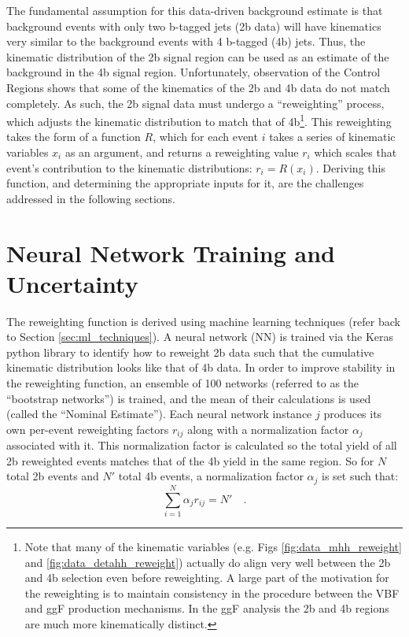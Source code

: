     The fundamental assumption for this data-driven background estimate
        is that background events with only two b-tagged jets (2b data)
        will have kinematics very similar to the background events with 4 b-tagged (4b) jets.
    Thus, the kinematic distribution of the 2b signal region can be used as an estimate of the background in the 4b signal region.
    Unfortunately, observation of the Control Regions shows that some of the kinematics of the 2b and 4b data do not match completely.
    As such, the 2b signal data must undergo a ``reweighting'' process,
        which adjusts the kinematic distribution to match that of 4b\footnote{
            Note that many of the kinematic variables
                (e.g. Figs \ref{fig:data_mhh_reweight} and \ref{fig:data_detahh_reweight})
                actually do align very well between the 2b and 4b selection even before reweighting.
            A large part of the motivation for the reweighting is to maintain consistency in the procedure between
                the VBF and ggF production mechanisms.
            In the ggF analysis\cite{hh4b_2021_int_note} the 2b and 4b regions are much more kinematically distinct.
        }.
    This reweighting takes the form of a function $R$,
        which for each event $i$ takes a series of kinematic variables $x_i$ as an argument,
        and returns a reweighting value $r_i$ which scales that event's contribution to the kinematic distributions:
        $r_i = R(x_i)$.
    Deriving this function, and determining the appropriate inputs for it,
        are the challenges addressed in the following sections.

\pagebreak
\section{Neural Network Training and Uncertainty} \label{sec:nn_training}

    The reweighting function is derived using machine learning techniques (refer back to Section \ref{sec:ml_techniques}).
    A neural network (NN) is trained via the Keras python library\cite{keras} to identify how to reweight 2b data
        such that the cumulative kinematic distribution looks like that of 4b data.
    In order to improve stability in the reweighting function,
        an ensemble of 100 networks (referred to as the ``bootstrap networks'') is trained,
        and the mean of their calculations is used (called the ``Nominal Estimate'').
    Each neural network instance $j$ produces its own per-event reweighting factors $r_{ij}$
        along with a normalization factor $\alpha_j$ associated with it.
    This normalization factor is calculated so the total yield of all 2b reweighted events matches that of the 4b yield in the same region. 
    So for $N$ total 2b events and $N'$ total 4b events, a normalization factor $\alpha_j$ is set such that:
        \begin{equation}
            \sum_{i=1}^{N} \alpha_j r_{ij} = N'
            \quad.
        \end{equation}

